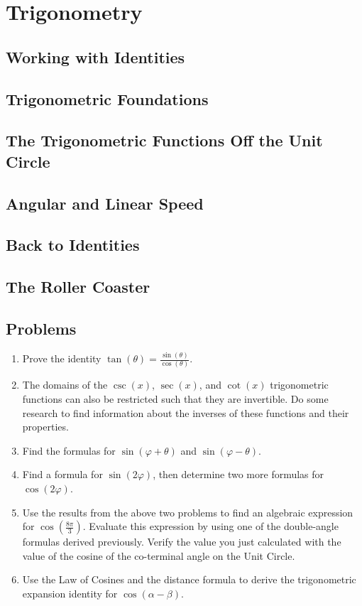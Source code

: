 \documentclass[../precalc.tex]{subfiles}
\begin{document}
\chapter{Trigonometry}
\section{Working with Identities}
\section{Trigonometric Foundations}
\section{The Trigonometric Functions Off the Unit Circle}
\section{Angular and Linear Speed}
\section{Back to Identities}
\section{The Roller Coaster}

\section*{Problems}
\begin{enumerate}
    \item Prove the identity $\tan(\theta) = \frac{\sin(\theta)}{\cos(\theta)}$.
    \item The domains of the $\csc(x)$, $\sec(x)$, and $\cot(x)$ trigonometric functions can also be restricted such that they are invertible. Do some research to find information about the inverses of these functions and their properties.
    \item Find the formulas for $\sin(\varphi + \theta)$ and $\sin(\varphi - \theta)$.
    \item Find a formula for $\sin(2\varphi)$, then determine two more formulas for $\cos(2\varphi)$.
    \item Use the results from the above two problems to find an algebraic expression for $\cos\left(\frac{8\pi}{3}\right)$. Evaluate this expression by using one of the double-angle formulas derived previously. Verify the value you just calculated with the value of the cosine of the co-terminal angle on the Unit Circle.
    \item Use the Law of Cosines and the distance formula to derive the trigonometric expansion identity for $\cos(\alpha - \beta)$.
\end{enumerate}
\end{document}
